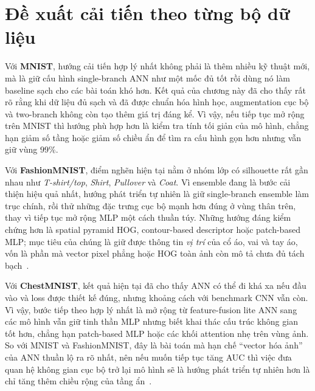 \section{Đề xuất cải tiến theo từng bộ dữ liệu}

Với \textbf{MNIST}, hướng cải tiến hợp lý nhất không phải là thêm nhiều kỹ thuật mới, mà là giữ cấu hình single-branch ANN như một mốc đủ tốt rồi dùng nó làm baseline sạch cho các bài toán khó hơn. Kết quả của chương này đã cho thấy rất rõ rằng khi dữ liệu đủ sạch và đã được chuẩn hóa hình học, augmentation cục bộ và two-branch không còn tạo thêm giá trị đáng kể. Vì vậy, nếu tiếp tục mở rộng trên MNIST thì hướng phù hợp hơn là kiểm tra tính tối giản của mô hình, chẳng hạn giảm số tầng hoặc giảm số chiều ẩn để tìm ra cấu hình gọn hơn nhưng vẫn giữ vùng $99\%$.

Với \textbf{FashionMNIST}, điểm nghẽn hiện tại nằm ở nhóm lớp có silhouette rất gần nhau như \textit{T-shirt/top}, \textit{Shirt}, \textit{Pullover} và \textit{Coat}. Vì ensemble đang là bước cải thiện hiệu quả nhất, hướng phát triển tự nhiên là giữ single-branch ensemble làm trục chính, rồi thử những đặc trưng cục bộ mạnh hơn đúng ở vùng thân trên, thay vì tiếp tục mở rộng MLP một cách thuần túy. Những hướng đáng kiểm chứng hơn là spatial pyramid HOG, contour-based descriptor hoặc patch-based MLP; mục tiêu của chúng là giữ được thông tin \textit{vị trí} của cổ áo, vai và tay áo, vốn là phần mà vector pixel phẳng hoặc HOG toàn ảnh còn mô tả chưa đủ tách bạch~\cite{fashionmnist_repo}.

Với \textbf{ChestMNIST}, kết quả hiện tại đã cho thấy ANN có thể đi khá xa nếu đầu vào và loss được thiết kế đúng, nhưng khoảng cách với benchmark CNN vẫn còn. Vì vậy, bước tiếp theo hợp lý nhất là mở rộng từ feature-fusion lite ANN sang các mô hình vẫn giữ tinh thần MLP nhưng biết khai thác cấu trúc không gian tốt hơn, chẳng hạn patch-based MLP hoặc các khối attention nhẹ trên vùng ảnh. So với MNIST và FashionMNIST, đây là bài toán mà hạn chế ``vector hóa ảnh'' của ANN thuần lộ ra rõ nhất, nên nếu muốn tiếp tục tăng AUC thì việc đưa quan hệ không gian cục bộ trở lại mô hình sẽ là hướng phát triển tự nhiên hơn là chỉ tăng thêm chiều rộng của tầng ẩn~\cite{medmnist_site}.
